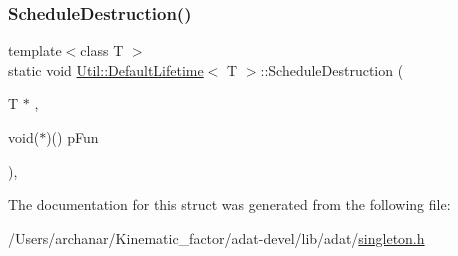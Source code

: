 \subsubsection{\texorpdfstring{ScheduleDestruction()}{ScheduleDestruction()}\hspace{0.1cm}{\footnotesize\ttfamily [3/3]}}
{\footnotesize\ttfamily template$<$class T $>$ \\
static void \mbox{\hyperlink{structUtil_1_1DefaultLifetime}{Util\+::\+Default\+Lifetime}}$<$ T $>$\+::Schedule\+Destruction (\begin{DoxyParamCaption}\item[{T $\ast$}]{,  }\item[{void($\ast$)()}]{p\+Fun }\end{DoxyParamCaption})\hspace{0.3cm}{\ttfamily [inline]}, {\ttfamily [static]}}



The documentation for this struct was generated from the following file\+:\begin{DoxyCompactItemize}
\item 
/\+Users/archanar/\+Kinematic\+\_\+factor/adat-\/devel/lib/adat/\mbox{\hyperlink{adat-devel_2lib_2adat_2singleton_8h}{singleton.\+h}}\end{DoxyCompactItemize}
